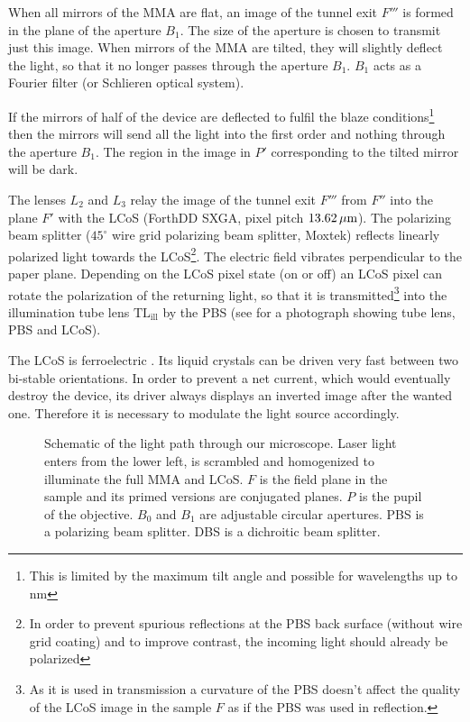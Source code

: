 When all mirrors of the MMA are flat, an image of the tunnel exit $F'''$
is formed in the plane of the aperture $B_1$. The size of the aperture
is chosen to transmit just this image. When mirrors of the MMA are
tilted, they will slightly deflect the light, so that it no longer
passes through the aperture $B_1$. $B_1$ acts as a Fourier filter (or
Schlieren optical system).

If the mirrors of half of the device are deflected to fulfil the blaze
conditions\footnote{This is limited by the maximum tilt angle and
  possible for wavelengths up to \unit[1000]{nm}} then the mirrors will
send all the light into the first order and nothing through the
aperture $B_1$.  The region in the image in $P'$ corresponding to the
tilted mirror will be dark.

The lenses $L_2$ and $L_3$ relay the image of the tunnel exit $F'''$
from $F''$ into the plane $F'$ with the LCoS (ForthDD SXGA, pixel
pitch $\unit[13.62]{\mu m}$). The polarizing beam splitter ($45^\circ$
wire grid polarizing beam splitter, Moxtek) reflects linearly
polarized light towards the LCoS\footnote{In order to prevent spurious
  reflections at the PBS back surface (without wire grid coating) and
  to improve contrast, the incoming light should already be
  polarized}. The electric field vibrates perpendicular to the paper
plane. Depending on the LCoS pixel state (on or off) an LCoS pixel can
rotate the polarization of the returning light, so that it is
transmitted\footnote{As it is used in transmission a curvature of the
  PBS doesn't affect the quality of the LCoS image in the sample $F$
  as if the PBS was used in reflection.}  into the illumination tube
lens $\textrm{TL}_\textrm{ill}$ by the PBS (see  for
a photograph showing tube lens, PBS and LCoS).

The LCoS is ferroelectric \citetext{\citealp[see][]{1991Saleh} and
  \citealp[p.~192]{Goodman1996}}.  Its liquid crystals can be driven
very fast between two bi-stable orientations. In order to prevent a
net current, which would eventually destroy the device, its driver
always displays an inverted image after the wanted one. Therefore it
is necessary to modulate the light source accordingly.


\begin{figure}[H]
  \centering
  \def\svgscale{2}
  
  \caption{Schematic of the light path through our microscope. Laser
    light enters from the lower left, is scrambled and homogenized to
    illuminate the full MMA and LCoS. $F$ is the field plane in the
    sample and its primed versions are conjugated planes. $P$ is the
    pupil of the objective. $B_0$ and $B_1$ are adjustable circular
    apertures. PBS is a polarizing beam splitter. DBS is a dichroitic
    beam splitter.}
  \label{fig:memi-real}
\end{figure}


